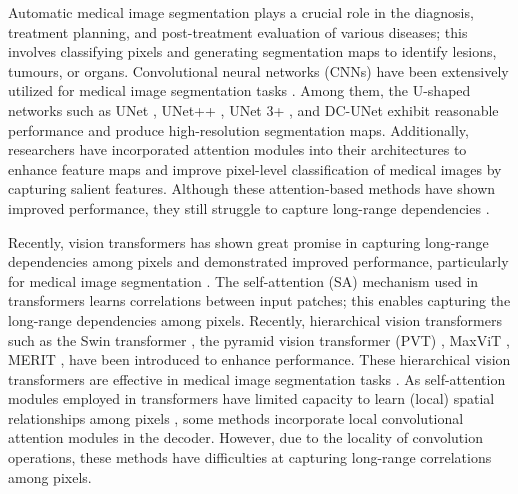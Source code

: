 \documentclass[10pt,twocolumn,letterpaper]{article}
\begin{document}
Automatic medical image segmentation plays a crucial role in the diagnosis, treatment planning, and post-treatment evaluation of various diseases; this involves classifying pixels and generating segmentation maps to identify lesions, tumours, or organs. Convolutional neural networks (CNNs) have been extensively utilized for medical image segmentation tasks \cite{ronneberger2015u, oktay2018attention, zhou2018unet++, huang2020unet, fan2020pranet, lou2021dc}. Among them, the U-shaped networks such as UNet \cite{ronneberger2015u}, UNet++ \cite{zhou2018unet++}, UNet 3+ \cite{huang2020unet}, and DC-UNet \cite{lou2021dc} exhibit reasonable performance 
and produce high-resolution segmentation maps. Additionally, researchers have incorporated attention modules into their architectures \cite{oktay2018attention, chen2018reverse, fan2020pranet} to enhance feature maps and improve pixel-level classification of medical images by capturing salient features. Although these attention-based methods have shown improved performance, they still struggle to capture long-range dependencies \cite{Rahman_2023_WACV}.

Recently, vision transformers \cite{dosovitskiy2020image} has shown great promise in capturing long-range dependencies among pixels and demonstrated improved performance, particularly for
medical image segmentation \cite{chen2021transunet, cao2021swin, dong2021polyp, wang2022stepwise, Rahman_2023_WACV, rahman2023multi, zhang2021transfuse, wang2022uctransnet}. The self-attention (SA) mechanism used in transformers learns correlations between input patches; this enables capturing the long-range dependencies among pixels. Recently, hierarchical vision transformers such as the Swin transformer \cite{liu2021swin}, the pyramid vision transformer (PVT) \cite{wang2021pyramid}, MaxViT \cite{tu2022maxvit}, MERIT \cite{rahman2023multi}, 
have been introduced to enhance performance. These hierarchical vision transformers are effective in medical image segmentation tasks \cite{chen2021transunet, cao2021swin, dong2021polyp, wang2022stepwise, Rahman_2023_WACV, rahman2023multi}. As self-attention modules employed in transformers have limited capacity to learn (local) spatial relationships among pixels \cite{chu2021conditional, islam2020much}, some methods \cite{xie2021segformer, wang2022uformer, wang2022pvt, dong2021polyp, wang2022stepwise, Rahman_2023_WACV, rahman2023multi} incorporate local convolutional attention modules in the decoder. However, due to the locality of convolution operations, these methods have difficulties at capturing long-range correlations among pixels.
\end{document}
